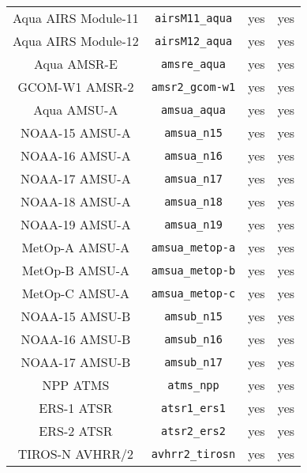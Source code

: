 \begin{center}
\begin{longtable}{c c c c}
  Aqua AIRS Module-11                & \texttt{airsM11\_aqua}       &  yes     &  yes       \\
  Aqua AIRS Module-12                & \texttt{airsM12\_aqua}       &  yes     &  yes       \\
  Aqua AMSR-E                        & \texttt{amsre\_aqua}         &  yes     &  yes       \\
  GCOM-W1 AMSR-2                     & \texttt{amsr2\_gcom-w1}      &  yes     &  yes       \\
  Aqua AMSU-A                        & \texttt{amsua\_aqua}         &  yes     &  yes       \\
  NOAA-15 AMSU-A                     & \texttt{amsua\_n15}          &  yes     &  yes       \\
  NOAA-16 AMSU-A                     & \texttt{amsua\_n16}          &  yes     &  yes       \\
  NOAA-17 AMSU-A                     & \texttt{amsua\_n17}          &  yes     &  yes       \\
  NOAA-18 AMSU-A                     & \texttt{amsua\_n18}          &  yes     &  yes       \\
  NOAA-19 AMSU-A                     & \texttt{amsua\_n19}          &  yes     &  yes       \\
  MetOp-A AMSU-A                     & \texttt{amsua\_metop-a}      &  yes     &  yes       \\
  MetOp-B AMSU-A                     & \texttt{amsua\_metop-b}      &  yes     &  yes       \\
  MetOp-C AMSU-A                     & \texttt{amsua\_metop-c}      &  yes     &  yes       \\
  NOAA-15 AMSU-B                     & \texttt{amsub\_n15}          &  yes     &  yes       \\
  NOAA-16 AMSU-B                     & \texttt{amsub\_n16}          &  yes     &  yes       \\
  NOAA-17 AMSU-B                     & \texttt{amsub\_n17}          &  yes     &  yes       \\
  NPP ATMS                           & \texttt{atms\_npp}           &  yes     &  yes       \\
  ERS-1 ATSR                         & \texttt{atsr1\_ers1}         &  yes     &  yes       \\
  ERS-2 ATSR                         & \texttt{atsr2\_ers2}         &  yes     &  yes       \\
  TIROS-N AVHRR/2                    & \texttt{avhrr2\_tirosn}      &  yes     &  yes       \\

\end{longtable}
\end{center}
